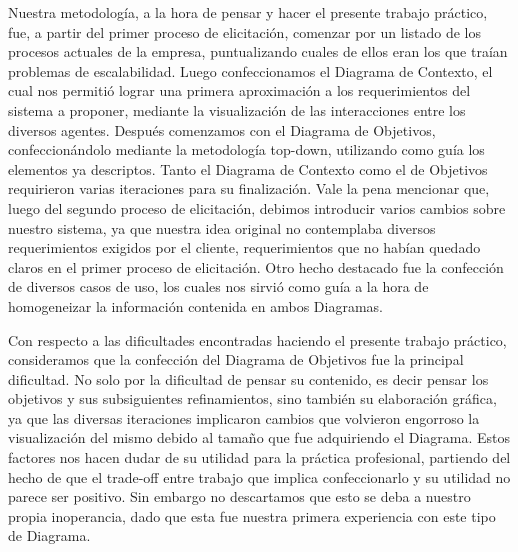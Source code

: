 Nuestra metodología, a la hora de pensar y hacer el presente trabajo práctico, fue, a partir del primer proceso de elicitación, comenzar por un listado de los procesos actuales de la empresa, puntualizando cuales de ellos eran los que traían problemas de escalabilidad. Luego confeccionamos el Diagrama de Contexto, el cual nos permitió lograr una primera aproximación a los requerimientos del sistema a proponer, mediante la visualización de las interacciones entre los diversos agentes. Después comenzamos con el Diagrama de Objetivos, confeccionándolo mediante la metodología top-down, utilizando como guía los elementos ya descriptos. Tanto el Diagrama de Contexto como el de Objetivos requirieron varias iteraciones para su finalización. Vale la pena mencionar que, luego del segundo proceso de elicitación, debimos introducir varios cambios sobre nuestro sistema, ya que nuestra idea original no contemplaba diversos requerimientos exigidos por el cliente, requerimientos que no habían quedado claros en el primer proceso de elicitación. Otro hecho destacado fue la confección de diversos casos de uso, los cuales nos sirvió como guía a la hora de homogeneizar la información contenida en ambos Diagramas.

Con respecto a las dificultades encontradas haciendo el presente trabajo práctico, consideramos que la confección del Diagrama de Objetivos fue la principal dificultad. No solo por la dificultad de pensar su contenido, es decir pensar los objetivos y sus subsiguientes refinamientos, sino también su elaboración gráfica, ya que las diversas iteraciones implicaron cambios que volvieron engorroso la visualización del mismo debido al tamaño que fue adquiriendo el Diagrama. Estos factores nos hacen dudar de su utilidad para la práctica profesional, partiendo del hecho de que el trade-off entre trabajo que implica confeccionarlo y su utilidad no parece ser positivo. Sin embargo no descartamos que esto se deba a nuestro propia inoperancia, dado que esta fue nuestra primera experiencia con este tipo de Diagrama.
